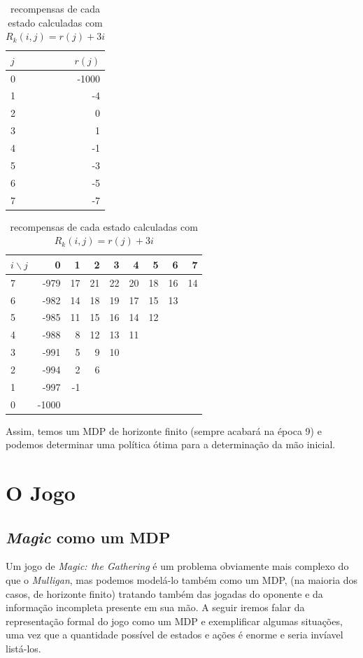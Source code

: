 \documentclass{book}
\begin{document}
\begin{table}[!h]
\parbox{.45\linewidth}{
\centering
\vspace{0.2cm}
\begin{tabular}{l|r}
$j$  & $r(j)$ \\ \hline
0 & -1000  \\
1 & -4     \\
2 & 0      \\
3 & 1      \\
4 & -1     \\
5 & -3    \\
6 & -5     \\
7 & -7
\end{tabular}
\caption{recompensas-base para $j = 0, \ldots, 7$}
\label{tab:rj}
}
\hfill
\parbox{.45\linewidth}{
\centering
\begin{tabular}{l|rrrrrrrr}
$i \backslash j$ & 0     & 1  & 2  & 3  & 4  & 5  & 6  & 7  \\ \hline
7 & -979  & 17 & 21 & 22 & 20 & 18 & 16 & 14 \\
6 & -982  & 14 & 18 & 19 & 17 & 15 & 13 &    \\
5 & -985  & 11 & 15 & 16 & 14 & 12 &    &    \\
4 & -988  & 8  & 12 & 13 & 11 &    &    &    \\
3 & -991  & 5  & 9  & 10 &    &    &    &    \\
2 & -994  & 2  & 6  &    &    &    &    &    \\
1 & -997  & -1 &    &    &    &    &    &    \\
0 & -1000 &    &    &    &    &    &    &
\end{tabular}
\caption{recompensas de cada estado calculadas com $R_k(i,j) = r(j) + 3i$}
\label{tab:Rij}
}
\end{table}
Assim, temos um MDP de horizonte finito (sempre acabará na época 9) e podemos determinar uma política ótima para a determinação da mão inicial.

\pagebreak

\section{O Jogo}

\subsection{\textit{Magic} como um MDP}

Um jogo de \textit{Magic: the Gathering} é um problema obviamente mais complexo do que o \textit{Mulligan}, mas podemos modelá-lo também como um MDP,
(na maioria dos casos, de horizonte finito) tratando também das jogadas do oponente e da informação incompleta presente em sua mão. A seguir iremos
falar da representação formal do jogo como um MDP e exemplificar algumas situações, uma vez que a quantidade possível de estados e ações é enorme e seria
invíavel listá-los.
\end{document}

